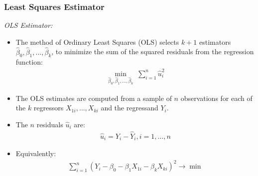 

\begin{frame}
\frametitle{Least Squares Estimator}
\emph{OLS Estimator:}
\begin{itemize}
\item The method of Ordinary Least Squares (OLS) selects $k+1$ estimators $\hat{\beta}_{0}, \hat{\beta}_{1},\ldots, \hat{\beta}_{k}$, to minimize the sum of the squared residuals from the regression function:
\begin{align*}
\min_{\hat{\beta}_{0}, \hat{\beta}_{1},\ldots, \hat{\beta}_{k}}\;
\sum_{i=1}^{n} \hat{u}_{i}^{2}
\end{align*}
\item The OLS estimates are computed from a sample of $n$ observations for each of the $k$ regressors $X_{1i},\ldots,X_{ki}$ and the regressand $Y_{i}$.
\item The $n$ residuals $\hat{u}_{i}$ are:
\begin{align*}
\hat{u}_{i} = Y_{i} - \hat{Y}_{i}, i=1,\ldots,n
\end{align*}
\item Equivalently:
\begin{align*}
\sum_{i=1}^{n}\left(Y_{i} - \beta_{0} - \beta_{1} X_{1i} - \beta_{k} X_{ki}\right)^{2}
\to \min
\end{align*}
\end{itemize}
\end{frame}
